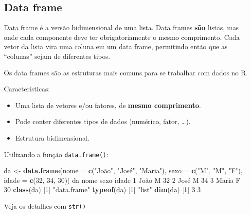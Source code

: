 \documentclass[10pt,a4paper]{book}
\newenvironment{Shaded}{\begin{snugshade}}{\end{snugshade}}
\newcommand{\KeywordTok}[1]{\textcolor[rgb]{0.13,0.29,0.53}{\textbf{#1}}}
\newcommand{\DataTypeTok}[1]{\textcolor[rgb]{0.13,0.29,0.53}{#1}}
\newcommand{\DecValTok}[1]{\textcolor[rgb]{0.00,0.00,0.81}{#1}}
\newcommand{\StringTok}[1]{\textcolor[rgb]{0.31,0.60,0.02}{#1}}
\newcommand{\NormalTok}[1]{#1}
\providecommand{\tightlist}{%
  \setlength{\itemsep}{0pt}\setlength{\parskip}{0pt}}
\begin{document}
\subsection{Data frame}\label{data-frame}

Data frame é a versão bidimensional de uma lista. Data frames
\textbf{são} listas, mas onde cada componente deve ter obrigatoriamente
o mesmo comprimento. Cada vetor da lista vira uma coluna em um data
frame, permitindo então que as ``colunas'' sejam de diferentes tipos.

Os data frames são as estruturas mais comuns para se trabalhar com dados
no R.

Características:

\begin{itemize}
\tightlist
\item
  Uma lista de vetores e/ou fatores, de \textbf{mesmo comprimento}.
\item
  Pode conter diferentes tipos de dados (numérico, fator, \ldots{}).
\item
  Estrutura bidimensional.
\end{itemize}

Utilizando a função \texttt{data.frame()}:

\begin{Shaded}
\begin{Highlighting}[]
\NormalTok{da <-}\StringTok{ }\KeywordTok{data.frame}\NormalTok{(}\DataTypeTok{nome =} \KeywordTok{c}\NormalTok{(}\StringTok{"João"}\NormalTok{, }\StringTok{"José"}\NormalTok{, }\StringTok{"Maria"}\NormalTok{),}
                 \DataTypeTok{sexo =} \KeywordTok{c}\NormalTok{(}\StringTok{"M"}\NormalTok{, }\StringTok{"M"}\NormalTok{, }\StringTok{"F"}\NormalTok{),}
                 \DataTypeTok{idade =} \KeywordTok{c}\NormalTok{(}\DecValTok{32}\NormalTok{, }\DecValTok{34}\NormalTok{, }\DecValTok{30}\NormalTok{))}
\NormalTok{da}
\NormalTok{   nome sexo idade}
\DecValTok{1}\NormalTok{  João    M    }\DecValTok{32}
\DecValTok{2}\NormalTok{  José    M    }\DecValTok{34}
\DecValTok{3}\NormalTok{ Maria    F    }\DecValTok{30}
\KeywordTok{class}\NormalTok{(da)}
\NormalTok{[}\DecValTok{1}\NormalTok{] }\StringTok{"data.frame"}
\KeywordTok{typeof}\NormalTok{(da)}
\NormalTok{[}\DecValTok{1}\NormalTok{] }\StringTok{"list"}
\KeywordTok{dim}\NormalTok{(da)}
\NormalTok{[}\DecValTok{1}\NormalTok{] }\DecValTok{3} \DecValTok{3}
\end{Highlighting}
\end{Shaded}

Veja os detalhes com \texttt{str()}
\end{document}
